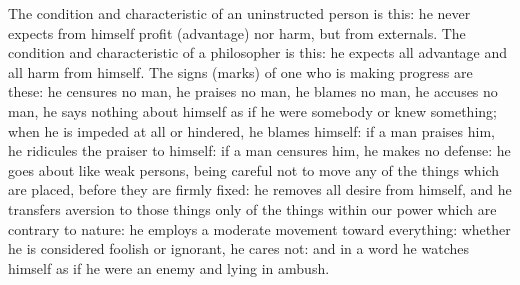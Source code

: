 The condition  and characteristic of an  uninstructed person is this:  he never
expects  from himself  profit (advantage)  nor  harm, but  from externals.  The
condition and characteristic of a philosopher is this: he expects all advantage
and all harm from himself. The signs  (marks) of one who is making progress are
these: he censures no  man, he praises no man, he blames no  man, he accuses no
man, he says  nothing about himself as  if he were somebody  or knew something;
when he is impeded at all or hindered, he blames himself: if a man praises him,
he  ridicules the  praiser to  himself:  if a  man  censures him,  he makes  no
defense: he goes about like weak persons,  being careful not to move any of the
things which  are placed, before they  are firmly fixed: he  removes all desire
from himself,  and he  transfers aversion  to those things  only of  the things
within our power  which are contrary to nature: he  employs a moderate movement
toward everything: whether he is considered  foolish or ignorant, he cares not:
and in a word he watches himself as if he were an enemy and lying in ambush.
